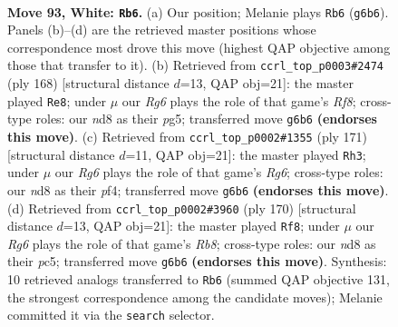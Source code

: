 \documentclass[11pt]{article}
\begin{document}
\clearpage

\begin{figure}[p]\centering
\begin{subfigure}{0.46\textwidth}\centering
\resizebox{\linewidth}{!}{%
\newchessgame
\chessboard[
  setfen={3n4/5k2/P5R1/8/8/7r/5K2/8 w - - 13 93},
  showmover=false,
  pgfstyle=straightmove, color=movearrow, markmove={g6-b6}
]}
\caption{}
\end{subfigure}\hfill
\begin{subfigure}{0.46\textwidth}\centering
\resizebox{\linewidth}{!}{%
\newchessgame
\chessboard[
  setfen={5R2/6k1/8/6p1/8/4KP2/r7/8 w - - 6 85},
  showmover=false,
  pgfstyle=straightmove, color=movearrow, markmove={f8-e8}
]}
\caption{}
\end{subfigure}
\\[4pt]
\begin{subfigure}{0.46\textwidth}\centering
\resizebox{\linewidth}{!}{%
\newchessgame
\chessboard[
  setfen={2R5/4k3/8/8/5P2/2p3r1/5K2/8 b - - 3 86},
  showmover=false,
  pgfstyle=straightmove, color=movearrow, markmove={g3-h3}
]}
\caption{}
\end{subfigure}\hfill
\begin{subfigure}{0.46\textwidth}\centering
\resizebox{\linewidth}{!}{%
\newchessgame
\chessboard[
  setfen={1R6/2k5/8/2p5/8/6r1/KP6/8 w - - 7 86},
  showmover=false,
  pgfstyle=straightmove, color=movearrow, markmove={b8-f8}
]}
\caption{}
\end{subfigure}
\caption{\textbf{Move 93, White: \texttt{Rb6}.} (a) Our position; Melanie plays \texttt{Rb6} (\texttt{g6b6}). Panels (b)--(d) are the retrieved master positions whose correspondence most drove this move (highest QAP objective among those that transfer to it). (b) Retrieved from \texttt{ccrl\_top\_p0003\#2474} (ply 168) [structural distance $d$=13, QAP obj=21]: the master played \texttt{Re8}; under $\mu$ our \emph{Rg6} plays the role of that game's \emph{Rf8}; cross-type roles: our \emph{n}d8 as their \emph{p}g5; transferred move \texttt{g6b6} \textbf{(endorses this move)}. (c) Retrieved from \texttt{ccrl\_top\_p0002\#1355} (ply 171) [structural distance $d$=11, QAP obj=21]: the master played \texttt{Rh3}; under $\mu$ our \emph{Rg6} plays the role of that game's \emph{Rg6}; cross-type roles: our \emph{n}d8 as their \emph{p}f4; transferred move \texttt{g6b6} \textbf{(endorses this move)}. (d) Retrieved from \texttt{ccrl\_top\_p0002\#3960} (ply 170) [structural distance $d$=13, QAP obj=21]: the master played \texttt{Rf8}; under $\mu$ our \emph{Rg6} plays the role of that game's \emph{Rb8}; cross-type roles: our \emph{n}d8 as their \emph{p}c5; transferred move \texttt{g6b6} \textbf{(endorses this move)}. Synthesis: 10 retrieved analogs transferred to \texttt{Rb6} (summed QAP objective 131, the strongest correspondence among the candidate moves); Melanie committed it via the \texttt{search} selector.}
\label{fig:thought-m184}
\end{figure}
\end{document}
